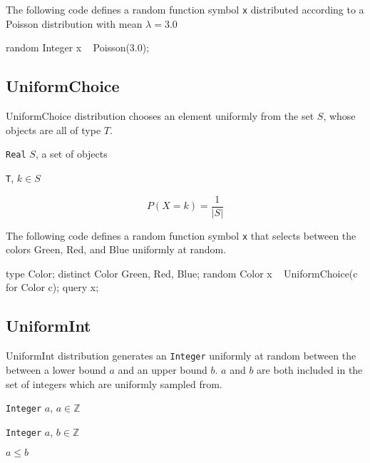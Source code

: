 The following code defines a random function symbol \verb|x| distributed according to a Poisson distribution with mean $\lambda = 3.0$
\begin{blogcode}
random Integer x ~ Poisson(3.0);
\end{blogcode}


\subsection{UniformChoice}
\label{uniformchoice-appexdix}

UniformChoice distribution chooses an element uniformly from the set $S$, whose objects are all of type $T$.

\begin{itemize*}
\item[] \verb|Real| $S$, a set of objects
\end{itemize*}

\begin{itemize*}
\item[] \verb|T|, $k \in S$
\end{itemize*}

\[
	P(X = k) = \frac{1}{|S|}
\]

The following code defines a random function symbol \verb|x| that selects between the colors Green, Red, and Blue uniformly at random.

\begin{blogcode}
type Color;
distinct Color Green, Red, Blue;
random Color x ~ UniformChoice({c for Color c});
query x;
\end{blogcode}

\subsection{UniformInt} \label{uniformint-section}
UniformInt distribution generates an \verb|Integer| uniformly at random between the between a lower bound $a$ and an upper bound $b$. $a$ and $b$ are both included in the set of integers which are uniformly sampled from.

\begin{itemize*}
\item[] \verb|Integer| $a$, $a \in \mathbb{Z}$
\item[] \verb|Integer| $a$, $b \in \mathbb{Z}$
\item[] $a \leq b$

\end{itemize*}

